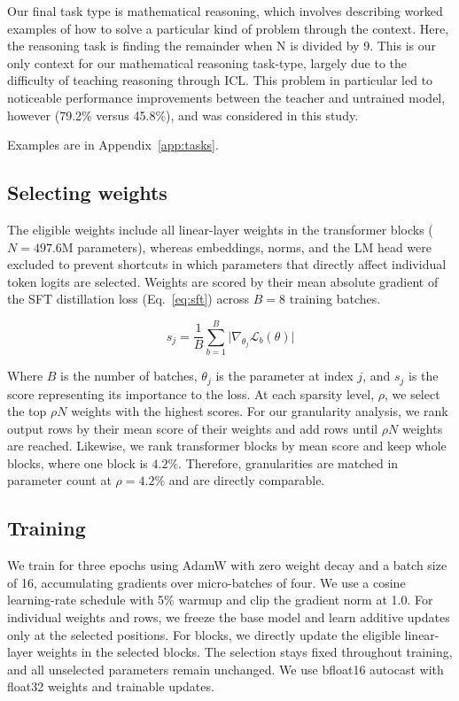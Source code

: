 \documentclass{article} %
\begin{document}
Our final task type is mathematical reasoning, which involves describing worked examples of how to solve a particular kind of problem through the context. Here, the reasoning task is finding the remainder when N is divided by 9. This is our only context for our mathematical reasoning task-type, largely due to the difficulty of teaching reasoning through ICL. This problem in particular led to noticeable performance improvements between the teacher and untrained model, however (79.2\% versus 45.8\%), and was considered in this study.

Examples are in Appendix~\ref{app:tasks}.

\begin{table}[t]
  \centering\small
  
  \caption{Task sizes and test accuracy before fine-tuning, with and without context. Accuracies are averaged across contexts.}
  \label{tab:tasks}
\end{table}

\subsection{Selecting weights}

The eligible weights include all linear-layer weights in the transformer blocks ($N = 497.6$M parameters), whereas embeddings, norms, and the LM head were excluded to prevent shortcuts in which parameters that directly affect individual token logits are selected. Weights are scored by their mean absolute gradient of the SFT distillation loss (Eq.~\ref{eq:sft}) across $B = 8$ training batches.

\begin{equation}
  s_j = \frac{1}{B}\sum_{b=1}^{B} \big| \nabla_{\theta_j} \mathcal{L}_b(\theta) \big|
  \label{eq:score}
\end{equation}

Where $B$ is the number of batches, $\theta_{j}$ is the parameter at index $j$, and $s_{j}$ is the score representing its importance to the loss. At each sparsity level, $\rho$, we select the top $\rho N$ weights with the highest scores. For our granularity analysis, we rank output rows by their mean score of their weights and add rows until $\rho N$ weights are reached. Likewise, we rank transformer blocks by mean score and keep whole blocks, where one block is $4.2\%$. Therefore, granularities are matched in parameter count at $\rho=4.2\%$ and are directly comparable.

\subsection{Training}
We train for three epochs using AdamW \citep{loshchilov2019adamw} with zero weight decay and a
batch size of 16, accumulating gradients over micro-batches of four. We use a cosine learning-rate
schedule with 5\% warmup and clip the gradient norm at 1.0. For individual weights and rows, we
freeze the base model and learn additive updates only at the selected positions. For blocks, we
directly update the eligible linear-layer weights in the selected blocks. The selection stays fixed
throughout training, and all unselected parameters remain unchanged. We use bfloat16 autocast
with float32 weights and trainable updates.
\end{document}
